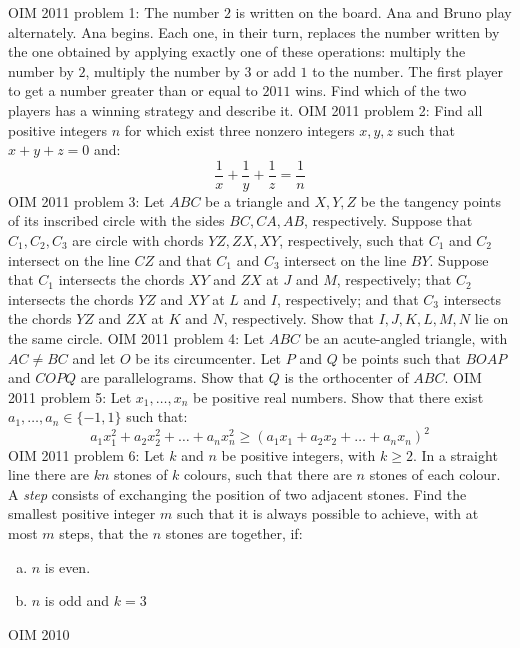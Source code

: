 OIM 2011 problem 1:  The number $2$ is written on the board. Ana and Bruno play alternately. Ana begins. Each one, in their turn, replaces the number written by the one obtained by applying exactly one of these operations: multiply the number by $2$, multiply the number by $3$ or add $1$ to the number. The first player to get a number greater than or equal to $2011$ wins. Find which of the two players has a winning strategy and describe it. 
OIM 2011 problem 2:  Find all positive integers $n$ for which exist three nonzero integers $x, y, z$ such that $x+y+z=0$ and:
\[ \frac{1}{x}+\frac{1}{y}+\frac{1}{z}=\frac{1}{n} \] 
OIM 2011 problem 3:  Let $ABC$ be a triangle and $X,Y,Z$ be the tangency points of its inscribed circle with the sides $BC, CA, AB$, respectively. Suppose that $C_1, C_2, C_3$ are circle with chords $YZ, ZX, XY$, respectively, such that $C_1$ and $C_2$ intersect on the line $CZ$ and that $C_1$ and $C_3$ intersect on the line $BY$. Suppose that $C_1$ intersects the chords $XY$ and $ZX$ at $J$ and $M$, respectively; that $C_2$ intersects the chords $YZ$ and $XY$ at $L$ and $I$, respectively; and that $C_3$ intersects the chords $YZ$ and $ZX$ at $K$ and $N$, respectively. Show that $I, J, K, L, M, N$ lie on the same circle. 
OIM 2011 problem 4:  Let $ABC$ be an acute-angled triangle, with $AC \neq BC$ and let $O$ be its circumcenter. Let $P$ and $Q$ be points such that $BOAP$ and $COPQ$ are parallelograms. Show that $Q$ is the orthocenter of $ABC$. 
OIM 2011 problem 5:  Let $x_1,\ldots ,x_n$ be positive real numbers. Show that there exist $a_1,\ldots ,a_n\in\{-1,1\}$ such that:
\[ a_1x_1^2+a_2x_2^2+\ldots +a_nx_n^2\ge (a_1x_1+a_2x_2+\ldots + a_n x_n)^2 \] 
OIM 2011 problem 6:  Let $k$ and $n$ be positive integers, with $k \geq 2$. In a straight line there are $kn$ stones of $k$ colours, such that there are $n$ stones of each colour. A \textit{step} consists of exchanging the position of two adjacent stones. Find the smallest positive integer $m$ such that it is always possible to achieve, with at most $m$ steps, that the $n$ stones are together, if:
\begin{enumerate}[a)]
  \item $n$ is even.
  \item $n$ is odd and $k=3$
\end{enumerate} 

OIM 2010 

